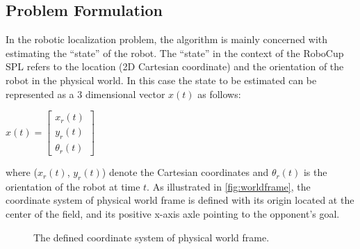 \subsection{Problem Formulation}\label{sub:problem}
In the robotic localization problem, the algorithm is mainly concerned with estimating the ``state'' of the robot. The ``state'' in the context of the RoboCup \gls{SPL} refers to the location (2D Cartesian coordinate) and the orientation of the robot in the physical world. In this case the state to be estimated can be represented as a 3 dimensional vector $x(t)$ as follows:
\begin{center}
$x(t) =
 \begin{bmatrix}
  x_{r}(t) \\
  y_{r}(t) \\
  \theta_{r}(t) 
 \end{bmatrix} $ \\
\end{center}
where ($x_{r}(t)$, $y_{r}(t)$) denote the Cartesian coordinates and $\theta_{r}(t)$ is the orientation of the robot at time $t$. As illustrated in \autoref{fig:worldframe}, the coordinate system of physical world frame is defined with its origin located at the center of the field, and its positive x-axis axle pointing to the opponent's goal.
\begin{figure}[h]
  \centering
  \caption{The defined coordinate system of physical world frame.}
  \label{fig:worldframe}
\end{figure}

